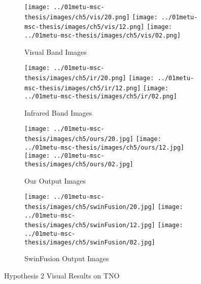 \begin{figure}[htbp]
    \centering
    \begin{subfigure}[b]{\textwidth}
        \texttt{[image: ../01metu-msc-thesis/images/ch5/vis/20.png]}
        \texttt{[image: ../01metu-msc-thesis/images/ch5/vis/12.png]}
        \texttt{[image: ../01metu-msc-thesis/images/ch5/vis/02.png]}
        \caption{Visual Band Images}
        \label{fig:ch5:met9:vis}
    \end{subfigure}
    \vspace{0.01cm}
    \begin{subfigure}[b]{\textwidth}
        \texttt{[image: ../01metu-msc-thesis/images/ch5/ir/20.png]}
        \texttt{[image: ../01metu-msc-thesis/images/ch5/ir/12.png]}
        \texttt{[image: ../01metu-msc-thesis/images/ch5/ir/02.png]}
        \caption{Infrared Band Images}
        \label{fig:ch5:met9:ir}
    \end{subfigure}
    \vspace{0.01cm}
    \begin{subfigure}[b]{\textwidth}
        \texttt{[image: ../01metu-msc-thesis/images/ch5/ours/20.jpg]}
        \texttt{[image: ../01metu-msc-thesis/images/ch5/ours/12.jpg]}
        \texttt{[image: ../01metu-msc-thesis/images/ch5/ours/02.jpg]}
        \caption{Our Output Images}
        \label{fig:ch5:met9:ours}
    \end{subfigure}
    \vspace{0.01cm}
    \begin{subfigure}[b]{\textwidth}
        \texttt{[image: ../01metu-msc-thesis/images/ch5/swinFusion/20.jpg]}
        \texttt{[image: ../01metu-msc-thesis/images/ch5/swinFusion/12.jpg]}
        \texttt{[image: ../01metu-msc-thesis/images/ch5/swinFusion/02.jpg]}
        \caption{SwinFusion\cite{ma2022swinfusion} Output Images}
        \label{fig:ch5:met9:swin}
    \end{subfigure}
    \caption{Hypothesis 2 Visual Results on TNO}
    \label{fig:ch5:met4}
\end{figure}

